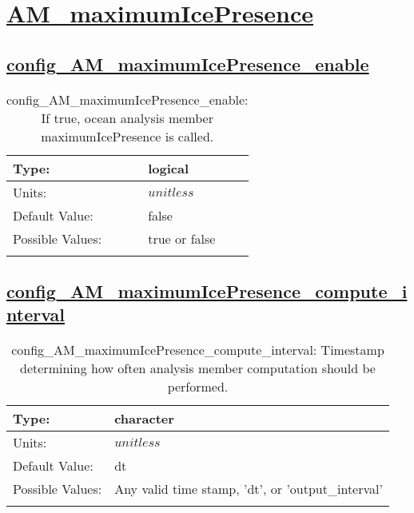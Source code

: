 \section[AM\_maximumIcePresence]{\hyperref[sec:nm_tab_AM_maximumIcePresence]{AM\_maximumIcePresence}}
\label{sec:nm_sec_AM_maximumIcePresence}
\subsection[config\_AM\_maximumIcePresence\_enable]{\hyperref[sec:nm_tab_AM_maximumIcePresence]{config\_AM\_maximumIcePresence\_enable}}
\label{subsec:nm_sec_config_AM_maximumIcePresence_enable}
\begin{center}
\begin{longtable}{| p{2.0in} || p{4.0in} |}
    \hline
    Type: & logical \\
    \hline
    Units: & $unitless$ \\
    \hline
    Default Value: & false \\
    \hline
    Possible Values: & true or false \\
    \hline
    \caption{config\_AM\_maximumIcePresence\_enable: If true, ocean analysis member maximumIcePresence is called.}
\end{longtable}
\end{center}
\subsection[config\_AM\_maximumIcePresence\_compute\_interval]{\hyperref[sec:nm_tab_AM_maximumIcePresence]{config\_AM\_maximumIcePresence\_compute\_interval}}
\label{subsec:nm_sec_config_AM_maximumIcePresence_compute_interval}
\begin{center}
\begin{longtable}{| p{2.0in} || p{4.0in} |}
    \hline
    Type: & character \\
    \hline
    Units: & $unitless$ \\
    \hline
    Default Value: & dt \\
    \hline
    Possible Values: & Any valid time stamp, 'dt', or 'output\_interval' \\
    \hline
    \caption{config\_AM\_maximumIcePresence\_compute\_interval: Timestamp determining how often analysis member computation should be performed.}
\end{longtable}
\end{center}
